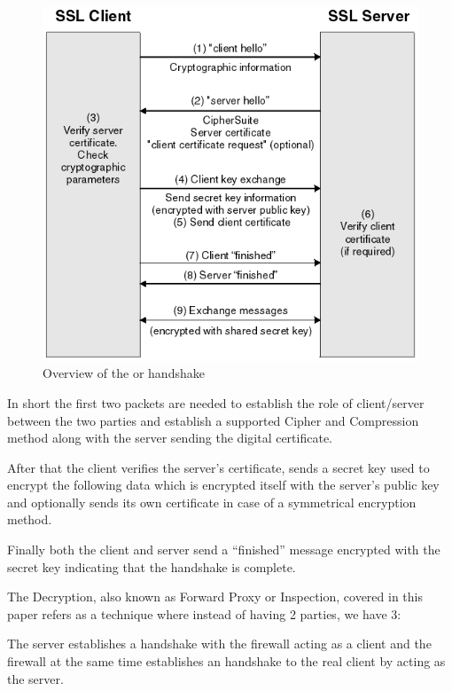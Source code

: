 \begin{figure}[!hb]
 \centering
 \includegraphics[width=13cm]{img/ssl_handshake.png}
 \caption{Overview of the  or  handshake\cite{ibm-handshake}}
 \label{SSL handshake}
\end{figure}

In short the first two packets are needed to establish the role of client/server between the two parties and establish a supported Cipher and Compression method along with the server sending the digital certificate.

After that the client verifies the server's certificate, sends a secret key used to encrypt the following data which is encrypted itself with the server's public key and optionally sends its own certificate in case of a symmetrical encryption method.

Finally both the client and server send a ``finished'' message encrypted with the secret key indicating that the handshake is complete.

The  Decryption, also known as  Forward Proxy or  Inspection, covered in this paper refers as a technique where instead of having  2 parties, we have 3:

The server establishes a handshake with the firewall acting as a client and the firewall at the same time establishes an handshake to the real client by acting as the server.

